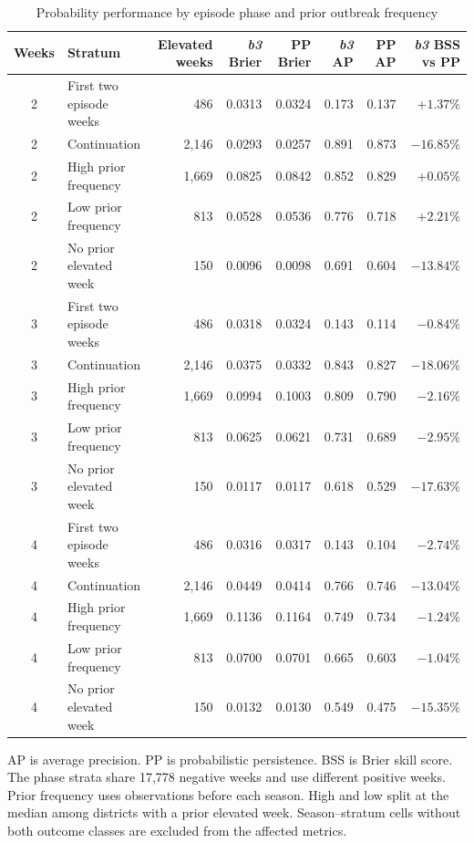\documentclass[10pt]{article}
\newcommand{\bthree}{\textit{b3}}
\begin{document}
\begin{table}[!h]
\centering
\caption{Probability performance by episode phase and prior outbreak frequency}
\small
\begin{tabular}{@{}clrrrrrr@{}}
\toprule
Weeks & Stratum & Elevated weeks & \bthree{} Brier & PP Brier & \bthree{} AP & PP AP & \bthree{} BSS vs PP\\
\midrule
2 & First two episode weeks & 486 & 0.0313 & 0.0324 & 0.173 & 0.137 & $+1.37\%$\\
2 & Continuation & 2,146 & 0.0293 & 0.0257 & 0.891 & 0.873 & $-16.85\%$\\
2 & High prior frequency & 1,669 & 0.0825 & 0.0842 & 0.852 & 0.829 & $+0.05\%$\\
2 & Low prior frequency & 813 & 0.0528 & 0.0536 & 0.776 & 0.718 & $+2.21\%$\\
2 & No prior elevated week & 150 & 0.0096 & 0.0098 & 0.691 & 0.604 & $-13.84\%$\\
3 & First two episode weeks & 486 & 0.0318 & 0.0324 & 0.143 & 0.114 & $-0.84\%$\\
3 & Continuation & 2,146 & 0.0375 & 0.0332 & 0.843 & 0.827 & $-18.06\%$\\
3 & High prior frequency & 1,669 & 0.0994 & 0.1003 & 0.809 & 0.790 & $-2.16\%$\\
3 & Low prior frequency & 813 & 0.0625 & 0.0621 & 0.731 & 0.689 & $-2.95\%$\\
3 & No prior elevated week & 150 & 0.0117 & 0.0117 & 0.618 & 0.529 & $-17.63\%$\\
4 & First two episode weeks & 486 & 0.0316 & 0.0317 & 0.143 & 0.104 & $-2.74\%$\\
4 & Continuation & 2,146 & 0.0449 & 0.0414 & 0.766 & 0.746 & $-13.04\%$\\
4 & High prior frequency & 1,669 & 0.1136 & 0.1164 & 0.749 & 0.734 & $-1.24\%$\\
4 & Low prior frequency & 813 & 0.0700 & 0.0701 & 0.665 & 0.603 & $-1.04\%$\\
4 & No prior elevated week & 150 & 0.0132 & 0.0130 & 0.549 & 0.475 & $-15.35\%$\\
\bottomrule
\end{tabular}

\vspace{2pt}\parbox{0.9\textwidth}{\footnotesize AP is average precision. PP is probabilistic persistence. BSS is Brier skill score. The phase strata share 17,778 negative weeks and use different positive weeks. Prior frequency uses observations before each season. High and low split at the median among districts with a prior elevated week. Season--stratum cells without both outcome classes are excluded from the affected metrics.}
\end{table}
\end{document}
